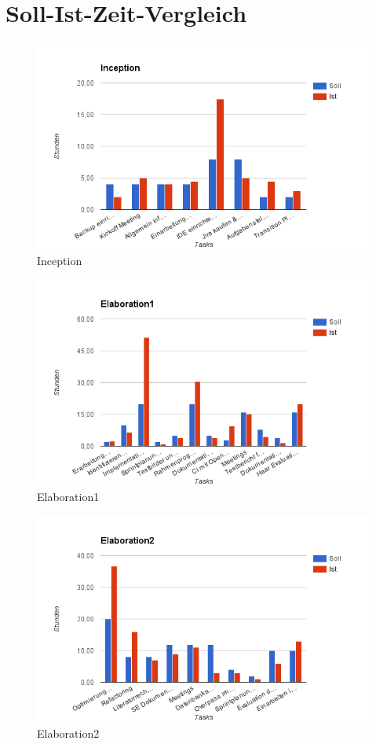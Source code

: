 \section{Soll-Ist-Zeit-Vergleich}

\begin{figure}[H]
\includegraphics[width=\textwidth]{images/inception.png}
\caption[Inception]{Inception}
\end{figure}

\begin{figure}[H]
\includegraphics[width=\textwidth]{images/elab1.png}
\caption[Elaboration1]{Elaboration1}
\end{figure}

\begin{figure}[H]
\includegraphics[width=\textwidth]{images/elab2.png}
\caption[Elaboration2]{Elaboration2}
\end{figure}

